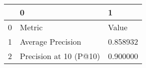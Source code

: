 \begin{tabular}{lll}
\toprule
 & 0 & 1 \\
\midrule
0 & Metric & Value \\
1 & Average Precision & 0.858932 \\
2 & Precision at 10 (P@10) & 0.900000 \\
\bottomrule
\end{tabular}
